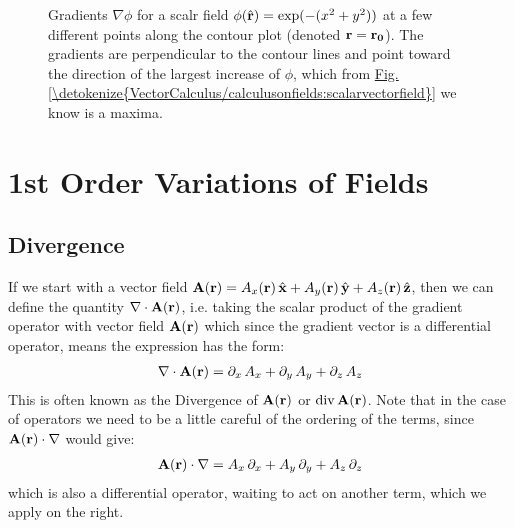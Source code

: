\documentclass[letterpaper,10pt,english]{jupyterBook}
\begin{document}
\begin{figure}[htbp]
\centering
\capstart

\noindent{}
\caption{Gradients \(\nabla \phi\) for a scalr field \(\phi(\hat{\bf r}) = \exp(-(x^2+y^2))\) at a few different points along the contour plot (denoted
\(\bf r=r_0\)).  The gradients are perpendicular to the contour lines and point toward the direction of the largest increase of \(\phi\),
which from \hyperref[\detokenize{VectorCalculus/calculusonfields:scalarvectorfield}]{Fig.\@ \ref{\detokenize{VectorCalculus/calculusonfields:scalarvectorfield}}} we know is a maxima.}\label{\detokenize{VectorCalculus/calculusonfields:scalarfieldgradient}}\end{figure}


\chapter{1st Order Variations of Fields}
\label{\detokenize{VectorCalculus/divandcurl:st-order-variations-of-fields}}\label{\detokenize{VectorCalculus/divandcurl::doc}}

\section{Divergence}
\label{\detokenize{VectorCalculus/divandcurl:divergence}}
\sphinxAtStartPar
If we start with a vector field \({\bf A(r)} = A_x({\bf r})\,\hat{\bf x} + A_y({\bf r})\,\hat{\bf y} + A_z({\bf r})\,\hat{\bf z} \), then we can define the quantity
\(\nabla\cdot {\bf A(r)}\), i.e. taking the scalar product of the gradient operator with vector field \({\bf A(r)} \) which since the gradient vector is a differential
operator, means the expression has the form:
\begin{equation*}
\begin{split}\nabla\cdot {\bf A(r)} = \partial_x\, A_x + \partial_y\, A_y + \partial_z\, A_z\end{split}
\end{equation*}
\sphinxAtStartPar
This is often known as the Divergence of \({\bf A(r)}\) or \(\text{div}\,{\bf A(r)}\).  Note that in the case of operators we need to be a little careful of the
ordering of the terms, since \({\bf A(r)}\cdot \nabla\) would give:
\begin{equation*}
\begin{split}{\bf A(r)} \cdot \nabla= A_x\,\partial_x  + A_y\,\partial_y  + A_z\,\partial_z  \end{split}
\end{equation*}
\sphinxAtStartPar
which is also a differential operator, waiting to act on another term, which we apply on the right.
\end{document}
